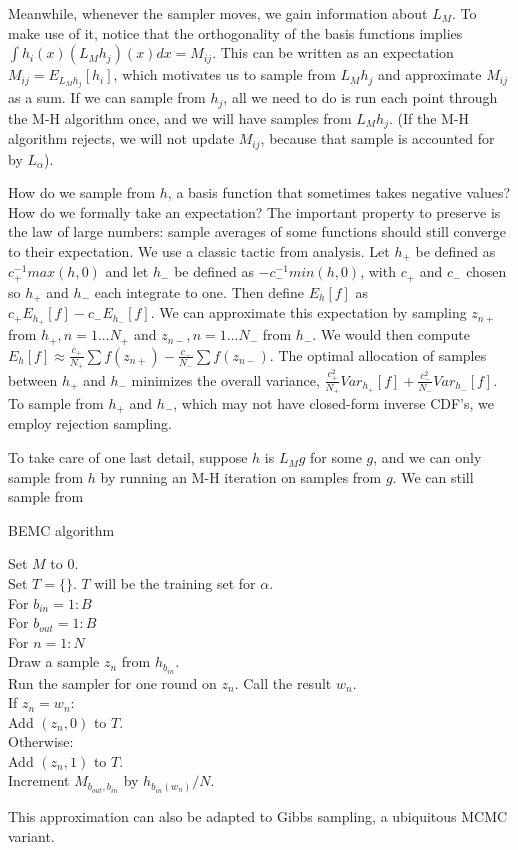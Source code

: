 \documentclass{article}
\begin{document}
Meanwhile, whenever the sampler moves, we gain information about $L_M$. To make use of it, notice that the orthogonality of the basis functions implies $\int h_i(x)(L_{M}h_j)(x)dx =  M_{ij}$. This can be written as an expectation $M_{ij} = E_{L_Mh_j}[h_i]$, which motivates us to sample from $L_Mh_j$ and approximate $M_{ij}$ as a sum. If we can sample from $h_j$, all we need to do is run each point through the M-H algorithm once, and we will have samples from $L_Mh_j$. (If the M-H algorithm rejects, we will not update $M_{ij}$, because that sample is accounted for by $L_{\alpha}$). 

How do we sample from $h$, a basis function that sometimes takes negative values? How do we formally take an expectation? The important property to preserve is the law of large numbers: sample averages of some functions should still converge to their expectation. We use a classic tactic from analysis. Let $h_+$ be defined as $c_+^{-1}max(h, 0)$ and let $h_-$ be defined as $-c_-^{-1}min(h, 0)$, with $c_+$ and $c_-$ chosen so $h_+$ and $h_-$ each integrate to one. Then define $E_{h}[f]$ as $c_+E_{h_+}[f]-c_-E_{h_-}[f]$. We can approximate this expectation by sampling $z_{n+}$ from $h_+, n=1...N_+$ and $z_{n-}, n=1...N_-$ from $h_-$. We would then compute $E_{h}[f] \approx \frac{c_+}{N_+}\sum f(z_{n+})-\frac{c_-}{N_-}\sum f(z_{n-})$. The optimal allocation of samples between $h_+$ and $h_-$ minimizes the overall variance, $\frac{c_+^2}{N_+}Var_{h_+}[f] + \frac{c_-^2}{N_-}Var_{h_-}[f]$. To sample from $h_+$ and $h_-$, which may not have closed-form inverse CDF's, we employ rejection sampling. 

To take care of one last detail, suppose $h$ is $L_Mg$ for some $g$, and we can only sample from $h$ by running an M-H iteration on samples from $g$. We can still sample from 

\begin{algorithm}[h]
\caption{BEMC algorithm}
Set $M$ to $0$.\\
Set $T = \{\}$. $T$ will be the training set for $\alpha$.\\
For $b_{in}  = 1:B$\\
\Indp
For $b_{out}  = 1:B$\\
\Indp
For $n = 1:N$\\
\Indp
Draw a sample $z_n$ from $h_{b_{in}}$.\\
Run the sampler for one round on $z_n$. Call the result $w_n$.\\
If $z_n = w_n$:\\
\Indp
Add $(z_n, 0)$ to $T$.\\
\Indm
Otherwise:\\
\Indp
Add $(z_n, 1)$ to $T$.\\
Increment $M_{b_{out}, b_{in}}$ by $h_{b_{in}(w_n)}/N$.\\
\end{algorithm}


This approximation can also be adapted to Gibbs sampling, a ubiquitous MCMC variant. 



\end{document}
